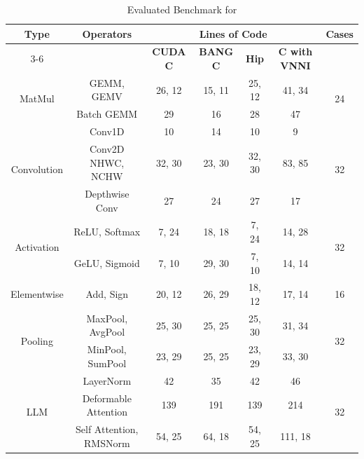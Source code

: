 \begin{table}[!ht]
    \vspace{-5pt}
    \caption{Evaluated Benchmark for \name{}}
    \label{tab::benchmark}
    \centering
    \vspace{-5pt}
    \scriptsize
    \setlength{\tabcolsep}{2pt} %
    \begin{tabular}{@{}c@{}c@{}cccc@{}@{}c}
        \toprule
        \multirow{2}{*}{\textbf{Type}} & \multirow{2}{*}{\textbf{Operators}} & \multicolumn{4}{c}{\textbf{Lines of Code}} & \multirow{2}{*}{\textbf{Cases}}\\
        \cmidrule(lr){3-6}
        & & \textbf{CUDA C} & \textbf{BANG C} & \textbf{Hip} & \textbf{C with VNNI} \\ 
        \midrule
        \multirow{2}{*}{MatMul} 
        & GEMM, GEMV & 26, 12 & 15, 11 & 25, 12 & 41, 34 & \multirow{2}{*}{24}\\
        & Batch GEMM & 29 & 16 & 28 & 47 & \\ 
        \midrule
        \multirow{3}{*}{Convolution} 
        & Conv1D & 10 & 14 & 10 & 9  & \multirow{3}{*}{32}\\
        & Conv2D NHWC, NCHW & 32, 30 & 23, 30 & 32, 30 & 83, 85 &\\
        & Depthwise Conv & 27 & 24 & 27 & 17 &\\ 
        \midrule
        \multirow{2}{*}{Activation}  
        & ReLU, Softmax & 7, 24 & 18, 18 & 7, 24 & 14, 28 & \multirow{2}{*}{32}\\
        & GeLU, Sigmoid & 7, 10 & 29, 30 & 7, 10 & 14, 14 & \\ 
        \midrule
        Elementwise 
        & Add, Sign & 20, 12 & 26, 29 & 18, 12 & 17, 14 & 16\\ 
        \midrule
        \multirow{2}{*}{Pooling} 
        & MaxPool, AvgPool & 25, 30 & 25, 25 & 25, 30 & 31, 34 & \multirow{2}{*}{32}\\
        & MinPool, SumPool & 23, 29 & 25, 25 & 23, 29 & 33, 30 & \\ 
        \midrule
        \multirow{3}{*}{LLM} 
        & LayerNorm & 42 & 35 & 42 & 46 & \multirow{3}{*}{32}
\\
        & Deformable Attention & 139 & 191 & 139 & 214 & \\
        & Self Attention, RMSNorm & 54, 25 & 64, 18 & 54, 25 & 111, 18 &\\ 
        \bottomrule
    \end{tabular}
\end{table}

